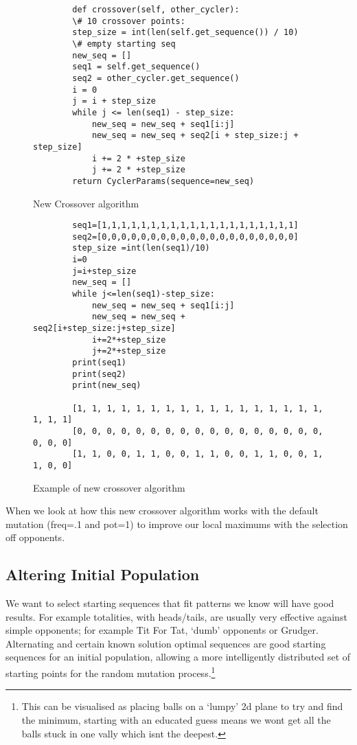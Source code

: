\begin{figure}[ht] 
    \begin{verbatim}
        def crossover(self, other_cycler):
        \# 10 crossover points:
        step_size = int(len(self.get_sequence()) / 10)
        \# empty starting seq
        new_seq = []
        seq1 = self.get_sequence()
        seq2 = other_cycler.get_sequence()
        i = 0
        j = i + step_size
        while j <= len(seq1) - step_size:
            new_seq = new_seq + seq1[i:j]
            new_seq = new_seq + seq2[i + step_size:j + step_size]
            i += 2 * +step_size
            j += 2 * +step_size
        return CyclerParams(sequence=new_seq)
    \end{verbatim}
    \caption{New Crossover algorithm}\label{fig:newCrossover}
\end{figure}

\begin{figure}[ht] 
    \begin{verbatim}
        seq1=[1,1,1,1,1,1,1,1,1,1,1,1,1,1,1,1,1,1,1,1]
        seq2=[0,0,0,0,0,0,0,0,0,0,0,0,0,0,0,0,0,0,0,0]
        step_size =int(len(seq1)/10)
        i=0
        j=i+step_size
        new_seq = []
        while j<=len(seq1)-step_size:
            new_seq = new_seq + seq1[i:j]
            new_seq = new_seq + seq2[i+step_size:j+step_size]
            i+=2*+step_size
            j+=2*+step_size
        print(seq1)
        print(seq2)
        print(new_seq)

        [1, 1, 1, 1, 1, 1, 1, 1, 1, 1, 1, 1, 1, 1, 1, 1, 1, 1, 1, 1]
        [0, 0, 0, 0, 0, 0, 0, 0, 0, 0, 0, 0, 0, 0, 0, 0, 0, 0, 0, 0]
        [1, 1, 0, 0, 1, 1, 0, 0, 1, 1, 0, 0, 1, 1, 0, 0, 1, 1, 0, 0]
    \end{verbatim}
    \caption{Example of new crossover algorithm}\label{fig:newCrossoverEX}
\end{figure}

When we look at how this new crossover algorithm works with the default mutation (freq=.1 and pot=1) to improve our local maximums with the selection off opponents.\\


\subsection{Altering Initial Population}\label{subsec:alteringinitialpopulation}
We want to select starting sequences that fit patterns we know will have good results.
For example totalities, with heads/tails, are usually very effective against simple opponents;
for example Tit For Tat, `dumb' opponents or Grudger.
Alternating and certain known solution optimal sequences are good starting sequences for an initial population, allowing a more intelligently distributed set of starting points for the random mutation process.\footnote{This can be visualised as placing balls on a `lumpy' 2d plane to try and find the minimum, starting with an educated guess means we wont get all the balls stuck in one vally which isnt the deepest.}

